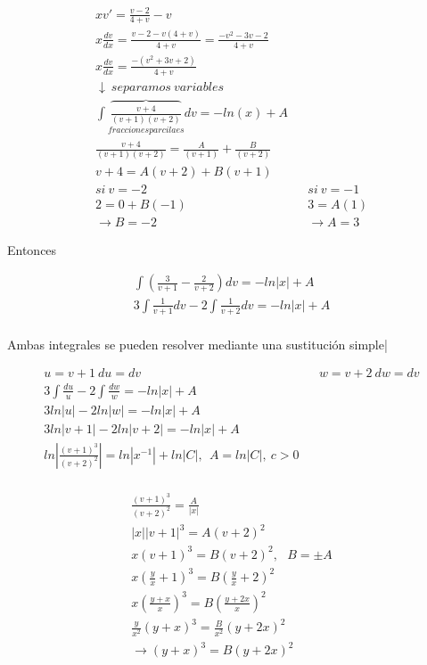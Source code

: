 \documentclass{article}
\begin{document}
\begin{eqnarray}
\nonumber xv' = \frac{v-2}{4+v} -v \\
\nonumber x \frac{dv}{dx} = \frac{v-2-v \left( 4+ v \right) }{ 4 + v} = \frac{-v^2 -3v -2}{4+v} \\
\nonumber x \frac{dv}{dx} = \frac{- \left( v^2 + 3v + 2 \right)}{4+v}  \\
\nonumber \downarrow \ separamos \ variables \\
\nonumber \int \overbrace{ \frac{v + 4}{\left( v + 1  \right) \left( v + 2 \right) } }_{fracciones parcilaes}  dv = -ln \left( x \right) + A \\
\nonumber \frac{v + 4}{\left( v + 1  \right) \left( v + 2 \right) } = \frac{A}{\left( v + 1  \right)} +  \frac{B}{\left( v + 2 \right) } \\
\nonumber v+4 = A (v+2) + B (v+1) \\
si  \ v = -2  & 				& si \ v = -1 \\
2 = 0 + B(-1) &				& 3 = A(1) \\
\rightarrow B = -2 &			& \rightarrow A = 3
\end{eqnarray}


Entonces

\begin{eqnarray}
\nonumber \int \left( \frac{3}{v+1} - \frac{2}{v+2} \right) dv = -ln |x| + A \\
\nonumber 3 \int \frac{1}{v+1} dv - 2 \int \frac{1}{v+2} dv  = -ln |x| + A \\
\end{eqnarray}

Ambas integrales se pueden resolver mediante una sustitución simple|

\begin{eqnarray}
\nonumber u = v + 1 \ du =dv &			& w = v+2 \ dw=dv \\
\nonumber 3 \int \frac{du}{u} - 2 \int \frac{dw}{w} = -ln |x| + A \\
\nonumber 3 ln|u| - 2ln |w| = -ln|x| + A \\
\nonumber 3 ln |v+1| - 2 ln |v +2 | =  -ln|x| + A \\
\nonumber ln | \frac{(v+1)^3}{(v+2)^2} | = ln|x^{-1}| + ln |C|, \ \ A =ln |C|, \ c>0 \\
\end{eqnarray}

\begin{eqnarray}
\nonumber \frac{(v+1)^3}{(v+2)^2} = \frac{A}{|x|} \\
\nonumber |x| | v +1 |^3 = A (v+2)^2 \\ 
\nonumber x (v+1)^3 = B (v+2) ^2 , \ \ \ B = \pm A \\
\nonumber x \left( \frac{y}{x} +1 \right)^3 = B \left( \frac{y}{x} + 2 \right)^2 \\
\nonumber x \left( \frac{y+x}{x} \right)^3 = B \left(\frac{y+2x}{x} \right)^2 \\
\nonumber \frac{y}{x^2} \left( y+x \right)^3 = \frac{B}{x^2} \left( y + 2x \right)^2 \\
\nonumber \rightarrow \left( y + x \right)^3 = B \left( y + 2x \right)^2
\end{eqnarray}
\end{document}
